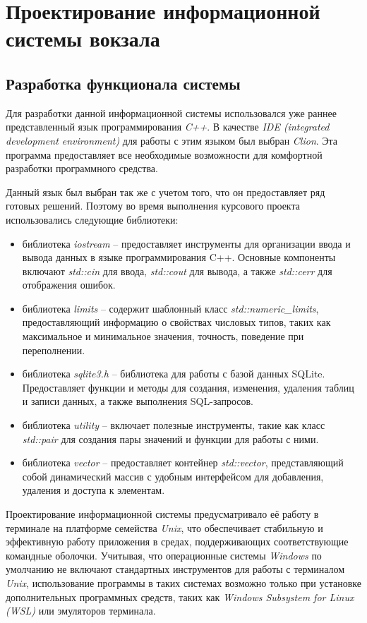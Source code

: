 \section{Проектирование информационной системы вокзала}

\subsection{Разработка функционала системы}

Для разработки данной информационной системы использовался уже раннее представленный язык программирования \textit{C++}. В качестве \textit{IDE (integrated development environment)} для работы с этим языком был выбран \textit{Clion}. Эта программа предоставляет все необходимые возможности для комфортной разработки программного средства. 

Данный язык был выбран так же с учетом того, что он предоставляет ряд готовых решений. Поэтому во время выполнения курсового проекта использовались следующие библиотеки:

\begin{itemize}
    \item библиотека \textit{iostream} -- предоставляет инструменты для организации ввода и вывода данных в языке программирования C++. Основные компоненты включают \textit{std::cin} для ввода, \textit{std::cout} для вывода, а также \textit{std::cerr} для отображения ошибок.
    \item библиотека \textit{limits} -- содержит шаблонный класс \textit{std::numeric\_limits}, предоставляющий информацию о свойствах числовых типов, таких как максимальное и минимальное значения, точность, поведение при переполнении.
    \item библиотека \textit{sqlite3.h} -- библиотека для работы с базой данных SQLite. Предоставляет функции и методы для создания, изменения, удаления таблиц и записи данных, а также выполнения SQL-запросов.
    \item библиотека \textit{utility} -- включает полезные инструменты, такие как класс \textit{std::pair} для создания пары значений и функции для работы с ними. 
    \item библиотека \textit{vector} -- предоставляет контейнер \textit{std::vector}, представляющий собой динамический массив с удобным интерфейсом для добавления, удаления и доступа к элементам.
\end{itemize}

Проектирование информационной системы предусматривало её работу в терминале на платформе семейства \textit{Unix}, что обеспечивает стабильную и эффективную работу приложения в средах, поддерживающих соответствующие командные оболочки. Учитывая, что операционные системы \textit{Windows} по умолчанию не включают стандартных инструментов для работы с терминалом \textit{Unix}, использование программы в таких системах возможно только при установке дополнительных программных средств, таких как \textit{Windows Subsystem for Linux (WSL)} или эмуляторов терминала.

